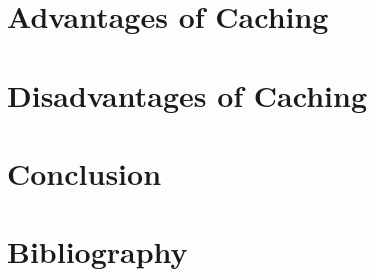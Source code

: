 \documentclass[a4paper,12pt]{article}
\begin{document}
\newpage
\section{Advantages of Caching}


\newpage
\section{Disadvantages of Caching}


\newpage
\section{Conclusion}


\newpage
\renewcommand\refname{\vskip -1cm}
\section{Bibliography}

\nocite{hwu:procon}
\nocite{MPEGDASH}
\nocite{citrix:caching}
\nocite{OnlineVideoBandwagon}
\nocite{ats:caching}
\nocite{expandedramblings:stats}
\nocite{techopedia:weighing}


\end{document}
